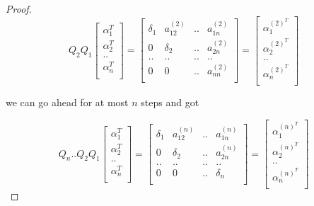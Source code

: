 \begin{proof}
    \[
    Q_2Q_1\begin{bmatrix}
            \alpha_1^T \\
            \alpha_2^T \\
            .. \\
            \alpha_n^T \\
    \end{bmatrix} = \begin{bmatrix}
        \delta_1 & a_{12}^{(2)} & .. & a_{1n}^{(2)} \\
        0 & \delta_2 & .. & a_{2n}^{(2)} \\
        .. & .. & .. & .. \\
        0 & 0 & .. & a_{nn}^{(2)} \\
    \end{bmatrix} =  \begin{bmatrix}
            \alpha_1^{(2)^T} \\
            \alpha_2^{(2)^T} \\
            .. \\
            \alpha_n^{(2)^T} \\
    \end{bmatrix}
    \]

    we can go ahead for at most $n$ steps and got


    \[
    Q_n..Q_2Q_1\begin{bmatrix}
            \alpha_1^T \\
            \alpha_2^T \\
            .. \\
            \alpha_n^T \\
    \end{bmatrix} = \begin{bmatrix}
        \delta_1 & a_{12}^{(n)} & .. & a_{1n}^{(n)} \\
        0 & \delta_2 & .. & a_{2n}^{(n)} \\
        .. & .. & .. & .. \\
        0 & 0 & .. & \delta_n \\
    \end{bmatrix} = \begin{bmatrix}
            \alpha_1^{(n)^T} \\
            \alpha_2^{(n)^T} \\
            .. \\
            \alpha_n^{(n)^T} \\
    \end{bmatrix}
    \]


\end{proof}
